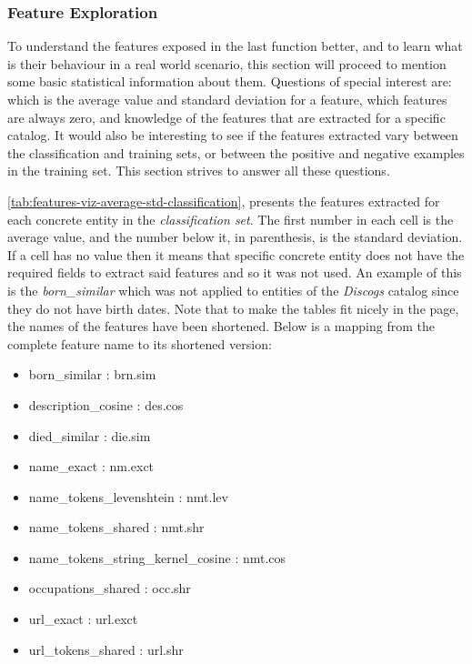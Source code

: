 \documentclass[epsfig,a4paper,11pt,titlepage,twoside,openany]{book}
\begin{document}


\subsubsection{Feature Exploration}
\label{sec:feature-viz}

To understand the features exposed in the last function better, and to learn what is their behaviour in a real world scenario, this section will proceed to mention some basic statistical information about them. Questions of special interest are: which is the average value and standard deviation for a feature, which features are always zero, and knowledge of the features that are extracted for a specific catalog. It would also be interesting to see if the features extracted vary between the classification and training sets, or between the positive and negative examples in the training set. This section strives to answer all these questions.

\autoref{tab:features-viz-average-std-classification}, presents the features extracted for each concrete entity in the \textit{classification set}. The first number in each cell is the average value, and the number below it, in parenthesis, is the standard deviation. If a cell has no value then it means that specific concrete entity does not have the required fields to extract said features and so it was not used. An example of this is the \textit{born\_similar} which was not applied to entities of the \textit{Discogs} catalog since they do not have birth dates. Note that to make the tables fit nicely in the page, the names of the features have been shortened. Below is a mapping from the complete feature name to its shortened version:

\begin{itemize}
    \item born\_similar : brn.sim
    \item description\_cosine : des.cos
    \item died\_similar : die.sim
    \item name\_exact : nm.exct
    \item name\_tokens\_levenshtein : nmt.lev 
    \item name\_tokens\_shared : nmt.shr
    \item name\_tokens\_string\_kernel\_cosine : nmt.cos
    \item occupations\_shared : occ.shr
    \item url\_exact : url.exct
    \item url\_tokens\_shared : url.shr 
\end{itemize}
\end{document}
